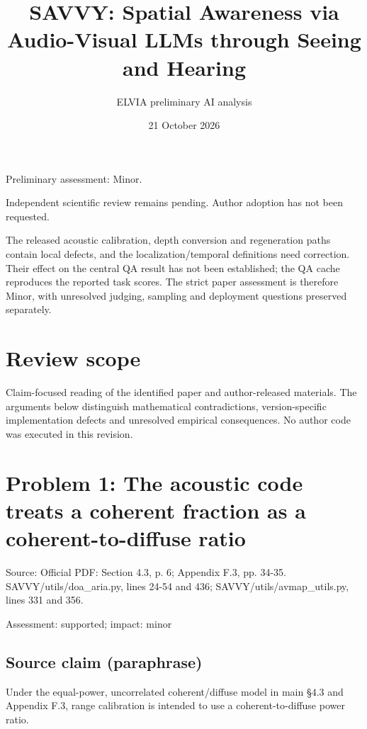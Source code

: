 \documentclass[11pt]{article}
\begin{document}
\title{SAVVY: Spatial Awareness via Audio-Visual LLMs through Seeing and Hearing}

\author{ELVIA preliminary AI analysis}\date{21 October 2026}\maketitle

Preliminary assessment: Minor.\par

Independent scientific review remains pending. Author adoption has not been requested.

The released acoustic calibration, depth conversion and regeneration paths contain local defects, and the localization/temporal definitions need correction. Their effect on the central QA result has not been established; the QA cache reproduces the reported task scores. The strict paper assessment is therefore Minor, with unresolved judging, sampling and deployment questions preserved separately.

\section*{Review scope}

Claim-focused reading of the identified paper and author-released materials. The arguments below distinguish mathematical contradictions, version-specific implementation defects and unresolved empirical consequences. No author code was executed in this revision.

\section*{Problem 1: The acoustic code treats a coherent fraction as a coherent-to-diffuse ratio}

Source: Official PDF: Section 4.3, p. 6; Appendix F.3, pp. 34-35. SAVVY/utils/doa\_aria.py, lines 24-54 and 436; SAVVY/utils/avmap\_utils.py, lines 331 and 356.

Assessment: supported; impact: minor

\subsection*{Source claim (paraphrase)}

Under the equal-power, uncorrelated coherent/diffuse model in main §\(4.3\) and Appendix F.3, range calibration is intended to use a coherent-to-diffuse power ratio.
\end{document}
